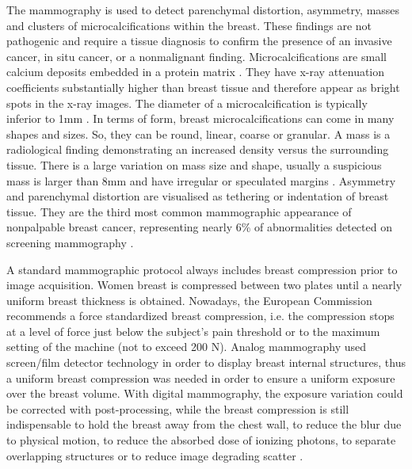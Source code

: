 The mammography is used to detect parenchymal distortion, asymmetry, masses and clusters of microcalcifications within the breast.  These findings are not pathogenic
and require a tissue diagnosis to confirm the
presence of an invasive cancer, in situ cancer, or a nonmalignant finding. Microcalcifications are small calcium deposits embedded in a protein matrix .   They have x-ray attenuation coefficients substantially higher than breast tissue and therefore appear as bright spots in the x-ray images. The diameter of a microcalcification
is typically inferior to 1mm \citep{henrot_breast_2014}. In terms of form, breast microcalcifications can come in many shapes and sizes.  So, they can be round, linear, coarse or granular.  A mass is a radiological finding demonstrating an increased density versus the surrounding tissue. There is a large variation on mass size and shape, usually a suspicious mass is larger than 8mm and have irregular or speculated margins \citep{mckenna_abnormal_1994}.  Asymmetry and parenchymal distortion are visualised as tethering or indentation of breast tissue. They are the
third most common mammographic appearance of nonpalpable
breast cancer, representing nearly 6\% of abnormalities detected on screening mammography \citep{gaur_architectural_2013}. 

A standard mammographic protocol always includes breast compression prior to image acquisition. Women breast is compressed between two plates until a nearly uniform breast thickness is obtained. Nowadays, the European Commission recommends a force standardized breast compression, i.e. the compression stops at a level of force just below the subject’s pain threshold or to the maximum setting of the machine (not to exceed 200 N). Analog mammography used screen/film detector technology in order to display breast internal structures, thus a uniform breast compression was needed in order to ensure a uniform exposure over the breast volume. With digital mammography, the exposure variation could be corrected with post-processing, while the breast compression is still indispensable to hold the breast away from the chest wall, to reduce the blur due to physical motion, to reduce the absorbed dose of ionizing photons, to separate overlapping structures or to reduce image degrading scatter \citep{kopans2007breast}.


